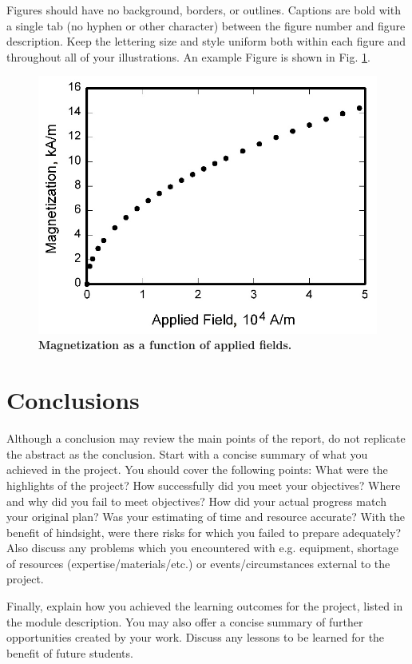 \documentclass{engr1000j-s2}
\begin{document}
  Figures should have no background, borders, or outlines. Captions are bold with
  a single tab (no hyphen or other character) between the figure number and figure
  description. Keep the lettering size and style uniform both within each figure
  and throughout all of your illustrations. An example Figure is shown in Fig.
  \ref{fig:graph}.

  \begin{figure}[H]
    \centering
    \includegraphics[width=.5\textwidth]{figures/graph.jpg}
    \caption{\quad \textbf{Magnetization as a function of applied fields.}}
    \label{fig:graph}
  \end{figure}

  \section{Conclusions}
  Although a conclusion may review the main points of the report, do not
  replicate the abstract as the conclusion. Start with a concise summary of what
  you achieved in the project. You should cover the following points: What were the
  highlights of the project? How successfully did you meet your objectives? Where
  and why did you fail to meet objectives? How did your actual progress match
  your original plan? Was your estimating of time and resource accurate? With
  the benefit of hindsight, were there risks for which you failed to prepare adequately?
  Also discuss any problems which you encountered with e.g. equipment, shortage
  of resources (expertise/materials/etc.) or events/circumstances external to the
  project.

  Finally, explain how you achieved the learning outcomes for the project, listed
  in the module description. You may also offer a concise summary of further
  opportunities created by your work. Discuss any lessons to be learned for the benefit
  of future students.

  \hspace{1em}
  
  
\end{document}

